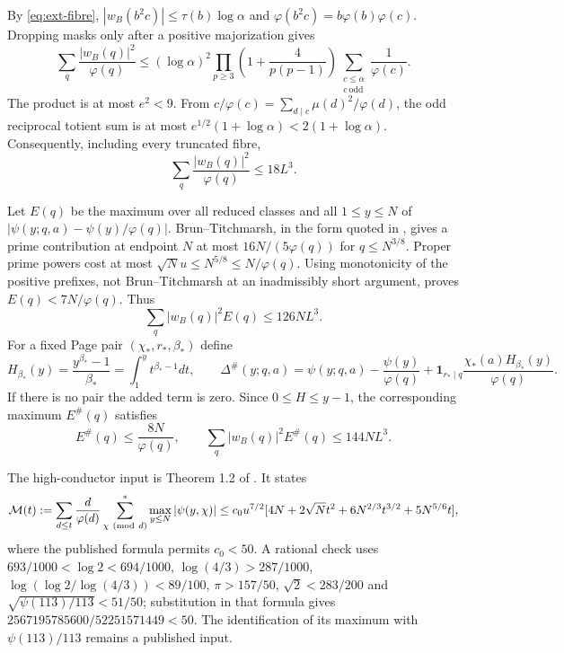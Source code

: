 \documentclass[11pt,a4paper]{article}
\theoremstyle{definition}
\theoremstyle{remark}
\begin{document}
By \eqref{eq:ext-fibre}, $|w_B(b^2c)|\leq\tau(b)\log\alpha$ and
$\varphi(b^2c)=b\varphi(b)\varphi(c)$. Dropping masks only after a
positive majorization gives
\[
 \sum_q\frac{|w_B(q)|^2}{\varphi(q)}
 \leq(\log\alpha)^2
 \prod_{p\geq3}\left(1+\frac4{p(p-1)}\right)
 \sum_{\substack{c\leq\alpha\\c\ \mathrm{odd}}}\frac1{\varphi(c)}.
\]
The product is at most $e^2<9$. From
$c/\varphi(c)=\sum_{d\mid c}\mu(d)^2/\varphi(d)$, the odd reciprocal
totient sum is at most $e^{1/2}(1+\log\alpha)<2(1+\log\alpha)$.
Consequently, including every truncated fibre,
\begin{equation}\label{eq:ext-moment}
 \sum_q\frac{|w_B(q)|^2}{\varphi(q)}\leq18L^3.
\end{equation}

Let $E(q)$ be the maximum over all reduced classes and all
$1\leq y\leq N$ of
$|\psi(y;q,a)-\psi(y)/\varphi(q)|$. Brun--Titchmarsh, in the form
quoted in \cite{AH}, gives a prime contribution at endpoint $N$ at
most $16N/(5\varphi(q))$ for $q\leq N^{3/8}$. Proper prime powers
cost at most $\sqrt N u\leq N^{5/8}\leq N/\varphi(q)$.
Using monotonicity of the positive prefixes, not Brun--Titchmarsh
at an inadmissibly short argument, proves $E(q)<7N/\varphi(q)$.
Thus
\begin{equation}\label{eq:ext-BTmoments}
 \sum_q|w_B(q)|^2E(q)\leq126NL^3.
\end{equation}
For a fixed Page pair $(\chi_*,r_*,\beta_*)$ define
\[
 H_{\beta_*}(y)=\frac{y^{\beta_*}-1}{\beta_*}
       =\int_1^y t^{\beta_*-1}dt,\qquad
 \Delta^\#(y;q,a)=\psi(y;q,a)-\frac{\psi(y)}{\varphi(q)}
       +\mathbf1_{r_*\mid q}\frac{\chi_*(a)H_{\beta_*}(y)}{\varphi(q)}.
\]
If there is no pair the added term is zero. Since $0\leq H\leq y-1$,
the corresponding maximum $E^\#(q)$ satisfies
\begin{equation}\label{eq:ext-correctedmoment}
 E^\#(q)\leq\frac{8N}{\varphi(q)},\qquad
 \sum_q|w_B(q)|^2E^\#(q)\leq144NL^3.
\end{equation}

The high-conductor input is Theorem 1.2 of \cite{AH}. It states
\[
 \mathcal M(t):=\sum_{d\leq t}\frac d{\varphi(d)}
       \sum_{\chi\ ({\rm mod}\ d)}^{*}\max_{y\leq N}|\psi(y,\chi)|
 \leq c_0u^{7/2}
       [4N+2\sqrt N t^2+6N^{2/3}t^{3/2}+5N^{5/6}t],
\]
where the published formula permits $c_0<50$. A rational check uses
$693/1000<\log2<694/1000$, $\log(4/3)>287/1000$,
$\log(\log2/\log(4/3))<89/100$, $\pi>157/50$,
$\sqrt2<283/200$ and $\sqrt{\psi(113)/113}<51/50$; substitution
in that formula gives $2567195785600/52251571449<50$.
The identification of its maximum with $\psi(113)/113$ remains a
published input.
\end{document}
